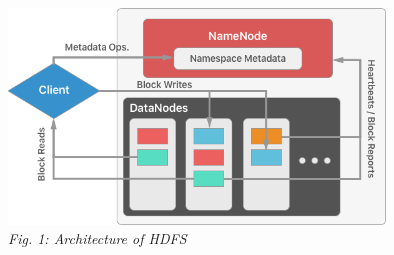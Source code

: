 \documentclass[11pt, a4paper]{article}
\begin{document}
\begin{center}
	\includegraphics[keepaspectratio=true, width=0.75\textwidth]{Architecture}\\
	\textit{Fig. 1: Architecture of HDFS}
\end{center}
\end{document}
